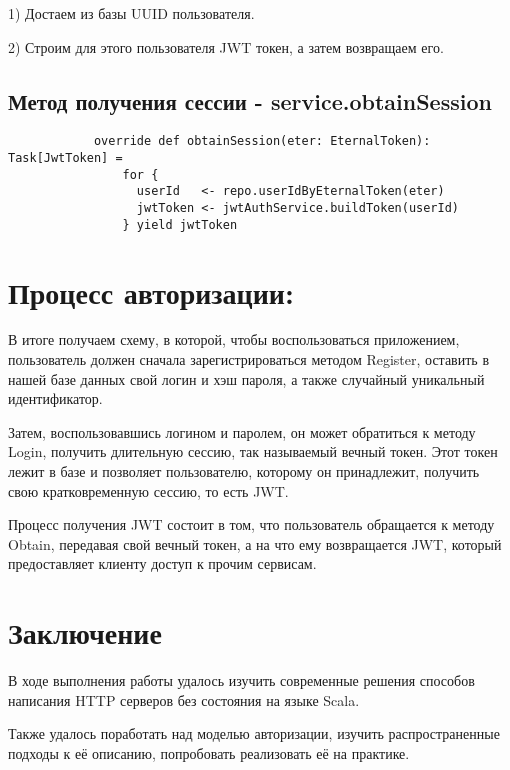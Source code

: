 \documentclass[14pt]{extarticle}
\begin{document}
    1) Достаем из базы UUID пользователя.

    2) Строим для этого пользователя JWT токен, а затем возвращаем его.

    \subsection{Метод получения сессии - service.obtainSession}
    \begin{verbatim}
            override def obtainSession(eter: EternalToken): Task[JwtToken] =
                for {
                  userId   <- repo.userIdByEternalToken(eter)
                  jwtToken <- jwtAuthService.buildToken(userId)
                } yield jwtToken
    \end{verbatim}

    \section{Процесс авторизации:}

    В итоге получаем схему, в которой, чтобы воспользоваться приложением, пользователь должен сначала
    зарегистрироваться методом Register, оставить в нашей базе данных свой логин и хэш пароля, а также случайный уникальный
    идентификатор.

    Затем, воспользовавшись логином и паролем, он может обратиться к методу Login, получить длительную сессию, так
    называемый вечный токен. Этот токен лежит в базе и позволяет пользователю, которому он принадлежит, получить свою
    кратковременную сессию, то есть JWT.

    Процесс получения JWT состоит в том, что пользователь обращается к методу Obtain, передавая свой вечный токен, а
    на что ему возвращается JWT, который предоставляет клиенту доступ к прочим сервисам.

    \section{Заключение}

    В ходе выполнения работы удалось изучить современные решения способов написания HTTP серверов без состояния на
    языке Scala.

    Также удалось поработать над моделью авторизации, изучить распространенные подходы к её описанию, попробовать
    реализовать её на практике.
\end{document}
